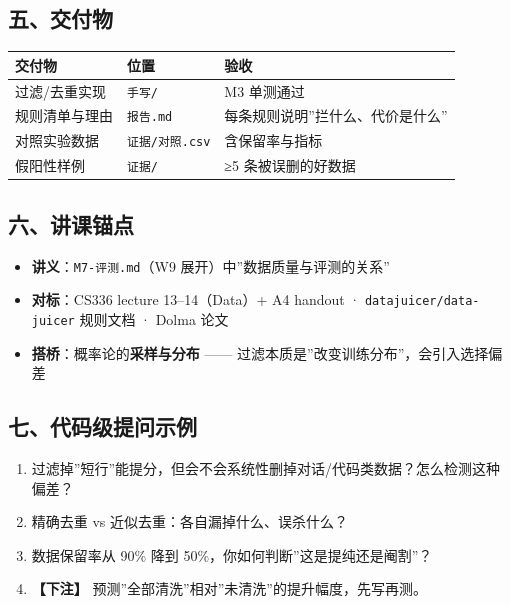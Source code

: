 \documentclass[
  chinese,
  11pt,
]{ctexart}
\newcounter{none} %
\providecommand{\tightlist}{%
  \setlength{\itemsep}{0pt}\setlength{\parskip}{0pt}}
\begin{document}
\subsection{五、交付物}\label{ux4e94ux4ea4ux4ed8ux7269-5}

{\def\LTcaptype{none} %
\begin{longtable}[]{@{}lll@{}}
\toprule\noalign{}
交付物 & 位置 & 验收 \\
\midrule\noalign{}
\endhead
\bottomrule\noalign{}
\endlastfoot
过滤/去重实现 & \texttt{手写/} & M3 单测通过 \\
规则清单与理由 & \texttt{报告.md} & 每条规则说明''拦什么、代价是什么'' \\
对照实验数据 & \texttt{证据/对照.csv} & 含保留率与指标 \\
假阳性样例 & \texttt{证据/} & ≥5 条被误删的好数据 \\
\end{longtable}
}

\subsection{六、讲课锚点}\label{ux516dux8bb2ux8bfeux951aux70b9-4}

\begin{itemize}
\tightlist
\item
  \textbf{讲义}：\texttt{M7-评测.md}（W9 展开）中''数据质量与评测的关系''
\item
  \textbf{对标}：CS336 lecture 13--14（Data）+ A4 handout · \texttt{datajuicer/data-juicer} 规则文档 · Dolma 论文
\item
  \textbf{搭桥}：概率论的\textbf{采样与分布} ------ 过滤本质是''改变训练分布''，会引入选择偏差
\end{itemize}

\subsection{七、代码级提问示例}\label{ux4e03ux4ee3ux7801ux7ea7ux63d0ux95eeux793aux4f8b-4}

\begin{enumerate}
\def\labelenumi{\arabic{enumi}.}
\tightlist
\item
  过滤掉''短行''能提分，但会不会系统性删掉对话/代码类数据？怎么检测这种偏差？
\item
  精确去重 vs 近似去重：各自漏掉什么、误杀什么？
\item
  数据保留率从 90\% 降到 50\%，你如何判断''这是提纯还是阉割''？
\item
  \textbf{【下注】} 预测''全部清洗''相对''未清洗''的提升幅度，先写再测。
\end{enumerate}
\end{document}
